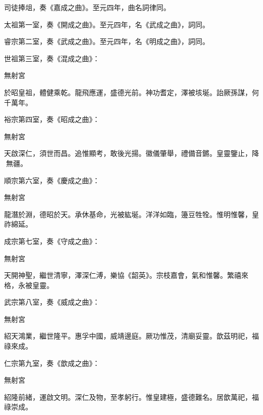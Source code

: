 \begin{pinyinscope}
 司徒捧俎，奏《嘉成之曲》。至元四年，曲名詞律同。



 太祖第一室，奏《開成之曲》。至元四年，名《武成之曲》，詞同。



 睿宗第二室，奏《武成之曲》。至元四年，名《明成之曲》，詞同。



 世祖第三室，奏《混成之曲》：



 無射宮



 於昭皇祖，體健乘乾。龍飛應運，盛德光前。神功耆定，澤被垓埏。詒厥孫謀，何千萬年。



 裕宗第四室，奏《昭成之曲》：



 無射宮



 天啟深仁，須世而昌。追惟顯考，敢後光揚。徽儀肇舉，禮備音鏘。皇靈鑒止，降無疆。



 順宗第六室，奏《慶成之曲》：



 無射宮



 龍潛於淵，德昭於天。承休基命，光被紘埏。洋洋如臨，籩豆牲牷。惟明惟馨，皇祚綿延。



 成宗第七室，奏《守成之曲》：



 無射宮



 天開神聖，繼世清寧，澤深仁溥，樂協《韶英》。宗枝嘉會，氣和惟馨。繁禧來格，永被皇靈。



 武宗第八室，奏《威成之曲》：



 無射宮



 紹天鴻業，繼世隆平。惠孚中國，威靖邊庭。厥功惟茂，清廟妥靈。歆茲明祀，福祿來成。



 仁宗第九室，奏《歆成之曲》：



 無射宮



 紹隆前緒，運啟文明。深仁及物，至孝躬行。惟皇建極，盛德難名。居歆萬祀，福祿崇成。




\end{pinyinscope}
